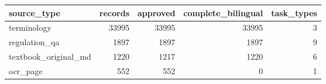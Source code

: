\begin{tabular}{lrrrr}
\toprule
source_type & records & approved & complete_bilingual & task_types \\
\midrule
terminology & 33995 & 33995 & 33995 & 3 \\
regulation_qa & 1897 & 1897 & 1897 & 9 \\
textbook_original_md & 1220 & 1217 & 1220 & 6 \\
ocr_page & 552 & 552 & 0 & 1 \\
\bottomrule
\end{tabular}
